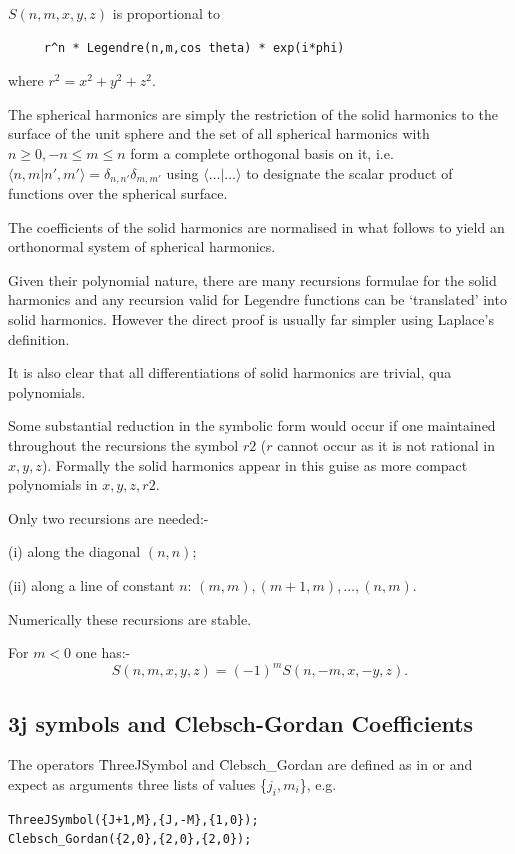 $S(n,m,x,y,z)$ is proportional to
\begin{verbatim}
     r^n * Legendre(n,m,cos theta) * exp(i*phi)
\end{verbatim}
where $r^2 = x^2 + y^2 + z^2$.

The spherical harmonics are simply the restriction of the solid
harmonics to the surface of the unit sphere and the set of all
spherical harmonics with $n \geq 0, -n \leq m \leq n$ form a complete
orthogonal basis on it, i.e.\ $\langle n,m | n',m' \rangle
= \delta_{n,n'} \delta_{m,m'}$ using $\langle \ldots | \ldots \rangle$
to designate the scalar product of functions over the spherical
surface.

The coefficients of the solid harmonics are normalised in what
follows to yield an orthonormal system of spherical harmonics.

Given their polynomial nature, there are many recursions formulae
for the solid harmonics and any recursion valid for Legendre functions
can be `translated' into solid harmonics. However the direct proof is
usually far simpler using Laplace's definition.

It is also clear that all differentiations of solid harmonics are
trivial, qua polynomials.

Some substantial reduction in the symbolic form would occur if one
maintained throughout the recursions the symbol $r2$ ($r$ cannot occur
as it is not rational in $x,y,z$). Formally the solid harmonics appear
in this guise as more compact polynomials in $x,y,z,r2$.

Only two recursions are needed:-

(i) along the diagonal $(n,n)$;

(ii) along a line of constant $n$: $(m,m),(m+1,m),\ldots,(n,m)$.

Numerically these recursions are stable.

For $m < 0$ one has:-
\[ S(n,m,x,y,z) = (-1)^m S(n,-m,x,-y,z). \]

\subsection{3j symbols and Clebsch-Gordan Coefficients}
\hypertarget{CLEBSCHG}{}
\hypertarget{operator:ThreeJSymbol}{}
\hypertarget{operator:Clebsch_Gordan}{}
The operators \f{ThreeJSymbol} and \f{Clebsch\_Gordan} are defined as
in \cite{LandoltBoernstein:68} or \cite{Edmonds:57} and expect as arguments
three lists of values \{$j_i,m_i$\}, e.g.
\begin{verbatim}
ThreeJSymbol({J+1,M},{J,-M},{1,0});
Clebsch_Gordan({2,0},{2,0},{2,0});
\end{verbatim}

